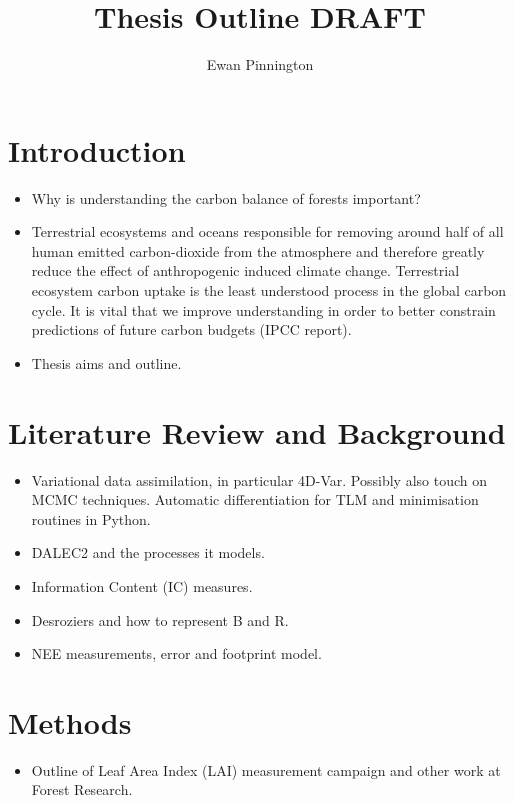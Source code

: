 \documentclass[11pt]{article}
\title{Thesis Outline DRAFT}
\author{Ewan Pinnington}
\begin{document}
\maketitle

\section{Introduction}
\begin{itemize}
\item Why is understanding the carbon balance of forests important?
\item Terrestrial ecosystems and oceans responsible for removing around half of all human emitted carbon-dioxide from the atmosphere and therefore greatly reduce the effect of anthropogenic induced climate change. Terrestrial ecosystem carbon uptake is the least understood process in the global carbon cycle. It is vital that we improve understanding in order to better constrain predictions of future carbon budgets (IPCC report).
\item Thesis aims and outline.
\end{itemize}


\section{Literature Review and Background}
\begin{itemize}
\item Variational data assimilation, in particular 4D-Var. Possibly also touch on MCMC techniques. Automatic differentiation for TLM and minimisation routines in Python.
\item DALEC2 and the processes it models.
\item Information Content (IC) measures.
\item Desroziers and how to represent B and R.
\item NEE measurements, error and footprint model.
\end{itemize}


\section{Methods}
\begin{itemize}
\item Outline of Leaf Area Index (LAI) measurement campaign and other work at Forest Research.
\end{itemize}
\end{document}
